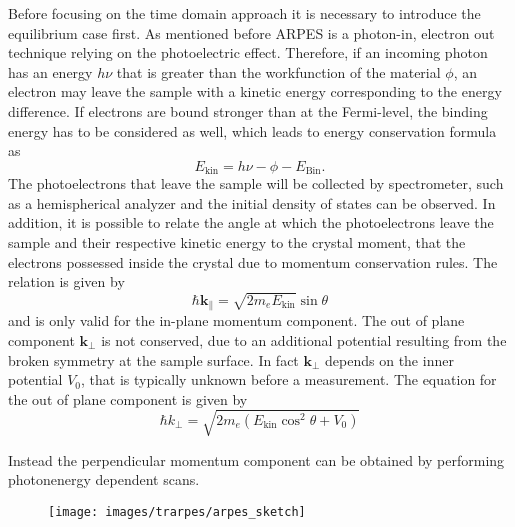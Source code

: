 Before focusing on the time domain approach it is necessary to introduce the equilibrium case first.
As mentioned before ARPES is a photon-in, electron out technique relying on the photoelectric effect.
Therefore, if an incoming photon has an energy $h\nu$ that is greater than the workfunction of the material $\phi$, an electron may leave the sample with a kinetic energy corresponding to the energy difference.
If electrons are bound stronger than at the Fermi-level, the binding energy has to be considered as well, which leads to energy conservation formula as
\begin{equation}
	E_\text{kin} = h\nu - \phi - E_\text{Bin}.
\end{equation}
The photoelectrons that leave the sample will be collected by spectrometer, such as a hemispherical analyzer and the initial density of states can be observed.
In addition, it is possible to relate the angle at which the photoelectrons leave the sample and their respective kinetic energy to the crystal moment, that the electrons possessed inside the crystal due to momentum conservation rules.
The relation is given by
\begin{equation}
	\hbar \mathbf{k}_\parallel = \sqrt{2m_eE_\text{kin}} \sin\theta
\end{equation}
and is only valid for the in-plane momentum component.
The out of plane component $\mathbf{k}_\perp$ is not conserved, due to an additional potential resulting from the broken symmetry at the sample surface.
In fact $\mathbf{k}_\perp$ depends on the inner potential $V_0$, that is typically unknown before a measurement.
The equation for the out of plane component is given by
\begin{equation}
	\hbar k_\perp = \sqrt{2m_e\left(E_\text{kin}\cos^2\theta+V_0\right)}
\end{equation}

Instead the perpendicular momentum component can be obtained by performing photonenergy dependent scans.
\begin{figure}
	\centering
	\texttt{[image: images/trarpes/arpes\_sketch]}
	\caption{}
	\label{fig:arpes_sketch}
\end{figure}


